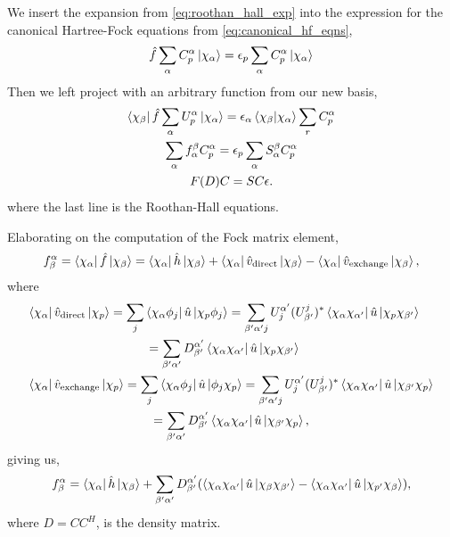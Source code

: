 We insert the expansion from \autoref{eq:roothan_hall_exp} into the expression 
for the canonical Hartree-Fock equations from \autoref{eq:canonical_hf_eqns},
\begin{equation}
    \hat{f}\sum_\alpha C^\alpha_p \ket{\chi_\alpha} = \epsilon_p \sum_\alpha C^\alpha_p \ket{\chi_\alpha}
\end{equation}
Then we left project with an arbitrary function from our new basis,
\begin{equation}
    \begin{gathered}
        \bra{\chi_\beta} \hat{f} \sum_\alpha U^\alpha_p \ket{\chi_\alpha}
            = \epsilon_\alpha \braket{\chi_\beta}{\chi_\alpha} \sum_r C^\alpha_p \\
        \sum_\alpha f^\beta_\alpha C^\alpha_p = \epsilon_p \sum_\alpha S^\beta_\alpha C^\alpha_p \\
        F(D) C = S C \epsilon.
    \end{gathered}
\end{equation}
where the last line is the Roothan-Hall equations.

Elaborating on the computation of the Fock matrix element,
\begin{equation}
    f^\alpha_\beta = \bra{\chi_\alpha} \hat{f} \ket{\chi_\beta}
        = \bra{\chi_\alpha} \hat{h} \ket{\chi_\beta} 
        + \bra{\chi_\alpha} \hat{v}_{\text{direct}} \ket{\chi_\beta}
        - \bra{\chi_\alpha} \hat{v}_{\text{exchange}} \ket{\chi_\beta},
\end{equation}
where
\begin{align}
    &\begin{gathered}
    \bra{\chi_\alpha} \hat{v}_{\text{direct}} \ket{\chi_p}
        = \sum_j \bra{\chi_\alpha \phi_j} \hat{u} \ket{\chi_p \phi_j} 
        = \sum_{\beta'\alpha'j} U^{\alpha'}_j (U^j_{\beta'})^*
            \bra{\chi_\alpha \chi_{\alpha'}} \hat{u} \ket{\chi_p \chi_{\beta'}} \\
        = \sum_{\beta'\alpha'} D^{\alpha'}_{\beta'} \bra{\chi_\alpha \chi_{\alpha'}} \hat{u} \ket{\chi_p \chi_{\beta'}}
    \end{gathered} \\
    &\begin{gathered}
    \bra{\chi_\alpha} \hat{v}_{\text{exchange}} \ket{\chi_p}
        = \sum_j \bra{\chi_\alpha \phi_j} \hat{u} \ket{\phi_j \chi_p} 
        = \sum_{\beta'\alpha'j} U^{\alpha'}_j (U^j_{\beta'})^* 
            \bra{\chi_\alpha \chi_{\alpha'}} \hat{u} \ket{\chi_{\beta'} \chi_p} \\
        = \sum_{\beta'\alpha'} D^{\alpha'}_{\beta'} \bra{\chi_\alpha \chi_{\alpha'}} \hat{u} \ket{\chi_{\beta'} \chi_p},  
    \end{gathered}
\end{align}
giving us,
\begin{equation}
    f^\alpha_\beta = \bra{\chi_\alpha}\hat{h} \ket{\chi_\beta} 
        + \sum_{\beta'\alpha'}D^{\alpha'}_{\beta'}(
            \bra{\chi_\alpha\chi_{\alpha'}}\hat{u} \ket{\chi_\beta\chi_{\beta'}}
            - \bra{\chi_\alpha\chi_{\alpha'}}\hat{u} \ket{\chi_{p'}\chi_\beta}
        ),
\end{equation}
where $D = CC^H$, is the density matrix.

